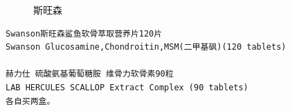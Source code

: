 \begin{figure}[htbp]
\begin{minipage}{.5\linewidth}
\caption{斯旺森}\label{fig-hive-2}
\end{minipage}
\end{figure} 
\begin{verbatim}
Swanson斯旺森鲨鱼软骨萃取营养片120片
Swanson Glucosamine,Chondroitin,MSM(二甲基砜)(120 tablets)

赫力仕 硫酸氨基葡萄糖胺 维骨力软骨素90粒
LAB HERCULES SCALLOP Extract Complex (90 tablets)
各自买两盒。
\end{verbatim}
